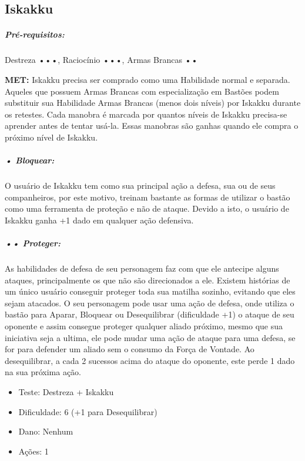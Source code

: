 
\subsection{Iskakku}

\subparagraph*{\bf Pré-requisitos:} Destreza •••, Raciocínio •••, Armas Brancas ••

{\bf MET:} Iskakku precisa ser comprado como uma Habilidade normal e separada. Aqueles que possuem Armas Brancas com especialização em Bastões podem substituir sua Habilidade Armas Brancas (menos dois níveis) por Iskakku durante os retestes. Cada manobra é marcada por quantos níveis de Iskakku precisa-se aprender antes de tentar usá-la. Essas manobras são ganhas quando ele compra o próximo nível de Iskakku.

\subparagraph{\bf • Bloquear:}
O usuário de Iskakku tem como sua principal ação a defesa, sua ou de seus companheiros, por este motivo, treinam bastante as formas de utilizar o bastão como uma ferramenta de proteção e não de ataque. Devido a isto, o usuário de Iskakku ganha +1 dado em qualquer ação defensiva.

\subparagraph{\bf •• Proteger:}
As habilidades de defesa de seu personagem faz com que ele antecipe alguns ataques, principalmente os que não são direcionados a ele. Existem histórias de um único usuário conseguir proteger toda sua matilha sozinho, evitando que eles sejam atacados. O seu personagem pode usar uma ação de defesa, onde utiliza o bastão para Aparar, Bloquear ou Desequilibrar (dificuldade +1) o ataque de seu oponente e assim consegue proteger qualquer aliado próximo, mesmo que sua iniciativa seja a ultima, ele pode mudar uma ação de ataque para uma defesa, se for para defender um aliado sem o consumo da Força de Vontade. Ao desequilibrar, a cada 2 sucessos acima do ataque do oponente, este perde 1 dado na sua próxima ação.
\begin{itemize}[noitemsep]
\item Teste: Destreza + Iskakku
\item Dificuldade: 6 (+1 para Desequilibrar)
\item Dano: Nenhum
\item Ações: 1
\end{itemize}

